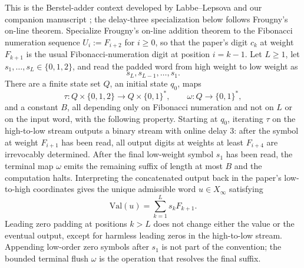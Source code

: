 \begin{theorem}\label{thm:online-zeckendorf-normalizer-interface}
This is the Berstel-adder context developed by Labbe--Lepsova \cite{LabbeLepsova2023FibonacciTwosComplement} and our companion manuscript \cite{MaZhang2026BerstelAdder}; the delay-three specialization below follows Frougny's on-line theorem.
Specialize Frougny's on-line addition theorem \cite[Proposition~13 and Corollary~4]{Frougny1999OnlineAddition} to the Fibonacci numeration sequence \(U_i:=F_{i+2}\) for \(i\ge 0\), so that the paper's digit \(c_k\) at weight \(F_{k+1}\) is the usual Fibonacci-numeration digit at position \(i=k-1\). Let \(L\ge 1\), let \(s_1,\dots,s_L\in\{0,1,2\}\), and read the padded word from high weight to low weight as
\[
s_L,s_{L-1},\dots,s_1.
\]
There are a finite state set \(Q\), an initial state \(q_0\), maps
\[
\tau:Q\times\{0,1,2\}\longrightarrow Q\times\{0,1\}^*,
\qquad
\omega:Q\longrightarrow \{0,1\}^*,
\]
and a constant \(B\), all depending only on Fibonacci numeration and not on \(L\) or on the input word, with the following property. Starting at \(q_0\), iterating \(\tau\) on the high-to-low stream outputs a binary stream with online delay \(3\): after the symbol at weight \(F_{i+1}\) has been read, all output digits at weights at least \(F_{i+4}\) are irrevocably determined. After the final low-weight symbol \(s_1\) has been read, the terminal map \(\omega\) emits the remaining suffix of length at most \(B\) and the computation halts. Interpreting the concatenated output back in the paper's low-to-high coordinates gives the unique admissible word \(u\in X_\infty\) satisfying
\[
\mathrm{Val}(u)=\sum_{k=1}^{L}s_kF_{k+1}.
\]
Leading zero padding at positions \(k>L\) does not change either the value or the eventual output, except for harmless leading zeros in the high-to-low stream. Appending low-order zero symbols after \(s_1\) is not part of the convention; the bounded terminal flush \(\omega\) is the operation that resolves the final suffix.
\end{theorem}

